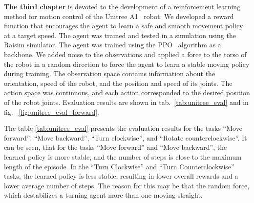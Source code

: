 \underline{\textbf{The third chapter}} is devoted to the development of a reinforcement learning method for motion control of the Unitree A1~\cite{unitree} robot. We developed a reward function that encourages the agent to learn a safe and smooth movement policy at a target speed. The agent was trained and tested in a simulation using the Raisim \cite{raisim} simulator. The agent was trained using the PPO~\cite{Schulman2017ProximalPO} algorithm as a backbone. We added noise to the observations and applied a force to the torso of the robot in a random direction to force the agent to learn a stable moving policy during training. The observation space contains information about the orientation, speed of the robot, and the position and speed of its joints. The action space was continuous, and each action corresponded to the desired position of the robot joints. Evaluation results are shown in tab.~\ref{tab:unitree_eval} and in fig.~ \ref{fig:unitree_eval_forward}. 

The table \ref{tab:unitree_eval} presents the evaluation results for the tasks ``Move forward'', ``Move backward'', ``Turn clockwise'', and ``Rotate counterclockwise''. It can be seen, that for the tasks ``Move forward'' and ``Move backward'', the learned policy is more stable, and the number of steps is close to the maximum length of the episode. In the ``Turn Clockwise'' and ``Turn Counterclockwise'' tasks, the learned policy is less stable, resulting in lower overall rewards and a lower average number of steps. The reason for this may be that the random force, which destabilizes a turning agent more than one moving straight.

